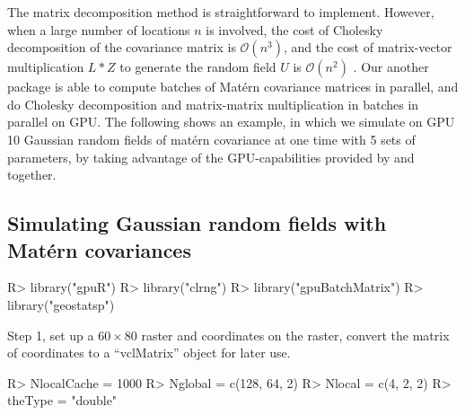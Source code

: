 \documentclass[article,nojss]{jss}\usepackage[]{graphicx}\usepackage[]{color}
\begin{document}
The matrix decomposition method is straightforward to implement. However, when a large number of locations $n$ is involved, the cost of Cholesky decomposition of the covariance matrix is $\mathcal{O}(n^3)$,  and the cost of matrix-vector multiplication $L*Z$ to generate the random field $U$ is $\mathcal{O}(n^2)$ \citep{LiuandLi2019}.  Our another  package  is able to compute batches of Mat\'ern covariance matrices in parallel, and do Cholesky decomposition and matrix-matrix multiplication in batches in parallel on GPU. The following shows an example, in which we simulate on GPU 10 Gaussian random fields of mat\'ern covariance at one time with 5 sets of parameters, by taking advantage of the GPU-capabilities provided by  and  together.

\subsection{Simulating Gaussian random fields with Mat\'ern covariances}
\begin{CodeChunk}
\begin{CodeInput}
R> library("gpuR")
R> library("clrng")
R> library("gpuBatchMatrix")
R> library("geostatsp")
\end{CodeInput} 
\end{CodeChunk} 

Step 1, set up a $60 \times 80$ raster and coordinates on the raster, convert the matrix of coordinates  to a ``vclMatrix'' object for later use.
\begin{CodeChunk}
\begin{CodeInput}
R> NlocalCache = 1000
R> Nglobal = c(128, 64, 2)
R> Nlocal = c(4, 2, 2)
R> theType = "double"
\end{CodeInput} 
\end{CodeChunk} 
\end{document}
